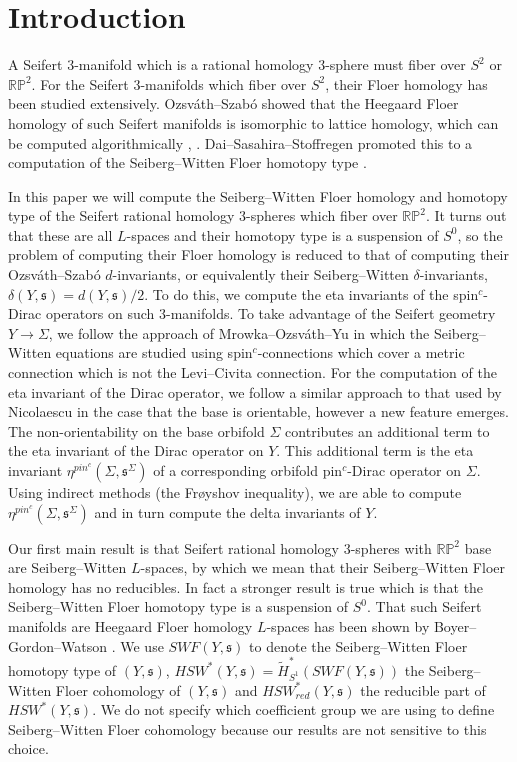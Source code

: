 \documentclass{amsart}
\theoremstyle{definition}
\theoremstyle{remark}
\numberwithin{equation}{section}
\begin{document}
\section{Introduction}

A Seifert $3$-manifold which is a rational homology $3$-sphere must fiber over $S^2$ or $\mathbb{RP}^2$. For the Seifert $3$-manifolds which fiber over $S^2$, their Floer homology has been studied extensively. Ozsv\'ath--Szab\'o showed that the Heegaard Floer homology of such Seifert manifolds is isomorphic to lattice homology, which can be computed algorithmically \cite{os}, \cite{nem2}. Dai--Sasahira--Stoffregen promoted this to a computation of the Seiberg--Witten Floer homotopy type \cite{dss}.

In this paper we will compute the Seiberg--Witten Floer homology and homotopy type of the Seifert rational homology $3$-spheres which fiber over $\mathbb{RP}^2$. It turns out that these are all $L$-spaces and their homotopy type is a suspension of $S^0$, so the problem of computing their Floer homology is reduced to that of computing their Ozsv\'ath--Szab\'o $d$-invariants, or equivalently their Seiberg--Witten $\delta$-invariants, $\delta(Y,\mathfrak{s}) = d(Y,\mathfrak{s})/2$. To do this, we compute the eta invariants of the spin$^c$-Dirac operators on such $3$-manifolds. To take advantage of the Seifert geometry $Y \to \Sigma$, we follow the approach of Mrowka--Ozsv\'ath--Yu \cite{moy} in which the Seiberg--Witten equations are studied using spin$^c$-connections which cover a metric connection which is not the Levi--Civita connection. For the computation of the eta invariant of the Dirac operator, we follow a similar approach to that used by Nicolaescu \cite{nic, nic2} in the case that the base is orientable, however a new feature emerges. The non-orientability on the base orbifold $\Sigma$ contributes an additional term to the eta invariant of the Dirac operator on $Y$. This additional term is the eta invariant $\eta^{pin^c}(\Sigma , \mathfrak{s}^\Sigma)$ of a corresponding orbifold pin$^c$-Dirac operator on $\Sigma$. Using indirect methods (the Fr\o yshov inequality), we are able to compute $\eta^{pin^c}(\Sigma , \mathfrak{s}^\Sigma)$ and in turn compute the delta invariants of $Y$.

Our first main result is that Seifert rational homology $3$-spheres with $\mathbb{RP}^2$ base are Seiberg--Witten $L$-spaces, by which we mean that their Seiberg--Witten Floer homology has no reducibles. In fact a stronger result is true which is that the Seiberg--Witten Floer homotopy type is a suspension of $S^0$. That such Seifert manifolds are Heegaard Floer homology $L$-spaces has been shown by Boyer--Gordon--Watson \cite[Proposition 5]{bgw}. We use $SWF(Y , \mathfrak{s})$ to denote the Seiberg--Witten Floer homotopy type of $(Y , \mathfrak{s})$, $HSW^*(Y , \mathfrak{s}) = \widetilde{H}_{S^1}^*( SWF(Y , \mathfrak{s}) )$ the Seiberg--Witten Floer cohomology of $(Y, \mathfrak{s})$ and $HSW^*_{red}(Y , \mathfrak{s})$ the reducible part of $HSW^*(Y , \mathfrak{s})$. We do not specify which coefficient group we are using to define Seiberg--Witten Floer cohomology because our results are not sensitive to this choice.
\end{document}

